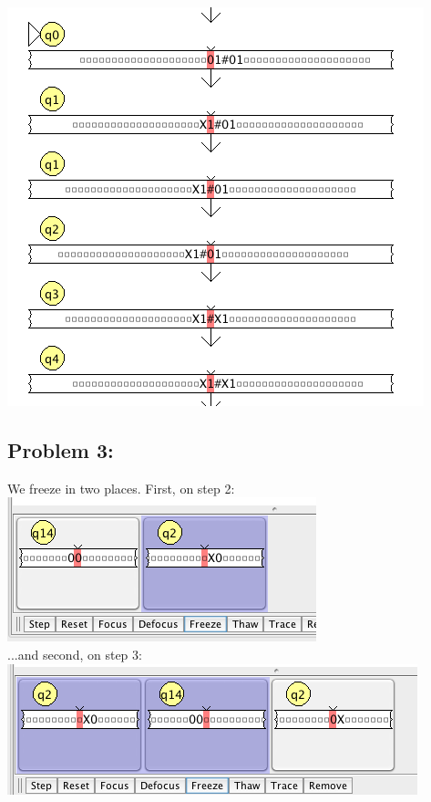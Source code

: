 \documentclass[a4paper]{article}
\begin{document}
\includegraphics[scale=0.50]{p2_trace.png}

\subsection*{Problem 3:}

We freeze in two places. First, on step 2: \\

\includegraphics[scale=0.50]{freeze_step_2.png} \\

...and second, on step 3: \\

\includegraphics[scale=0.50]{freeze_step_3.png} \\
\end{document}
